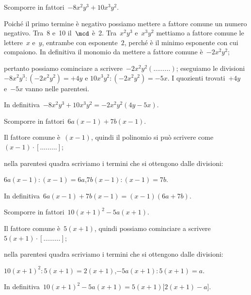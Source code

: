 \begin{exrig}
 \begin{esempio}
Scomporre in fattori~$-8x^{2}y^{3}+10x^{3}y^{2}$.
 \begin{enumeratea}
  \item Poiché il primo termine è negativo possiamo mettere a fattore comune un 
  numero negativo. Tra~8 e~10 il~$\mcd$ è~2. Tra~$x^{2}y^{3}$ e~$x^{3}y^{2}$ mettiamo 
  a fattore comune le lettere~$x$ e~$y$, entrambe con esponente~$2$, perché è
     il minimo esponente con cui compaiono. In definitiva il monomio da mettere a fattore comune è~$-2x^{2}y^{2}$;
  \item pertanto possiamo cominciare a scrivere~$-2x^{2}y^{2}(\ldots \ldots \ldots)$;
  eseguiamo le divisioni $-8x^{2}y^{3}:(-2x^{2}y^{2})=+4y$ e  $10x^{3}y^{2}:(-2x^{2}y^{2})=-5x$.
I quozienti trovati~$+4y$ e~$-5x$ vanno nelle parentesi.
 \end{enumeratea}
In definitiva~$-8x^{2}y^{3}+10x^{3}y^{2}=-2x^{2}y^{2}(4y-5x)$.
 \end{esempio}

 \begin{esempio}
Scomporre in fattori~$6a(x-1)+7b(x-1)$.
  \begin{enumeratea}
  \item Il fattore comune è~$(x-1)$, quindi il polinomio si può scrivere come~$(x-1)\cdot [\ldots \ldots \ldots]$;
  \item nella parentesi quadra scriviamo i termini che si ottengono dalle divisioni:
   \begin{description}
    \item $6a(x-1):(x-1)=6a$,\quad $7b(x-1):(x-1)=7b$.
   \end{description}
  \end{enumeratea}
  In definitiva~$6a(x-1)+7b(x-1)=(x-1)(6a+7b)$.
 \end{esempio}

 \begin{esempio}
Scomporre in fattori~$10(x+1)^{2}-5a(x+1)$.
  \begin{enumeratea}
  \item Il fattore comune è~$5(x+1)$, quindi possiamo cominciare a scrivere~$5(x+1)\cdot [\ldots \ldots \ldots]$;
  \item nella parentesi quadra scriviamo i termini che si ottengono dalle divisioni:
   \begin{description}
    \item $10(x+1)^{2}:5(x+1)=2(x+1)$,\quad $-5a(x+1):5(x+1)=a$.
   \end{description}
  \end{enumeratea}
  In definitiva~$10(x+1)^{2}-5a(x+1)=5(x+1)\bigl[2(x+1)-a \bigr]$.
 \end{esempio}

\end{exrig}

